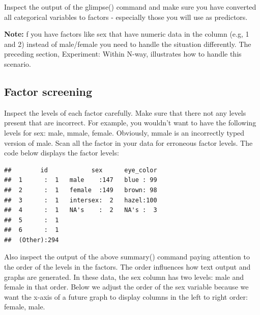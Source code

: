 \documentclass[
]{krantz}
\makeatletter
\newenvironment{Shaded}{\begin{snugshade}}{\end{snugshade}}
\newcommand{\KeywordTok}[1]{\textcolor[rgb]{0.27,0.27,0.27}{\textbf{#1}}}
\newcommand{\NormalTok}[1]{#1}
\newcommand{\OperatorTok}[1]{\textcolor[rgb]{0.43,0.43,0.43}{\textbf{#1}}}
\newcommand{\StringTok}[1]{\textcolor[rgb]{0.5,0.5,0.5}{#1}}
\newenvironment{kframe}{%
\medskip{}
\setlength{\fboxsep}{.8em}
 \def\at@end@of@kframe{}%
 \ifinner\ifhmode%
  \def\at@end@of@kframe{\end{minipage}}%
  \begin{minipage}{\columnwidth}%
 \fi\fi%
 \def\FrameCommand##1{\hskip\@totalleftmargin \hskip-\fboxsep
 \colorbox{shadecolor}{##1}\hskip-\fboxsep
     \hskip-\linewidth \hskip-\@totalleftmargin \hskip\columnwidth}%
 \MakeFramed {\advance\hsize-\width
   \@totalleftmargin\z@ \linewidth\hsize
   \@setminipage}}%
 {\par\unskip\endMakeFramed%
 \at@end@of@kframe}
\renewenvironment{Shaded}{\begin{kframe}}{\end{kframe}}
\makeatother
\begin{document}
Inspect the output of the glimpse() command and make sure you have converted all categorical variables to factors - especially those you will use as predictors.

\textbf{Note:} f you have factors like sex that have numeric data in the column (e.g, 1 and 2) instead of male/female you need to handle the situation differently. The preceding section, Experiment: Within N-way, illustrates how to handle this scenario.

\hypertarget{factor-screening-4}{%
\subsection{Factor screening}\label{factor-screening-4}}

Inspect the levels of each factor carefully. Make sure that there not any levels present that are incorrect. For example, you wouldn't want to have the following levels for sex: male, mmale, female. Obviously, mmale is an incorrectly typed version of male. Scan all the factor in your data for erroneous factor levels. The code below displays the factor levels:

\begin{Shaded}
\end{Shaded}

\begin{verbatim}
##        id            sex      eye_color  
##  1      :  1   male    :147   blue : 99  
##  2      :  1   female  :149   brown: 98  
##  3      :  1   intersex:  2   hazel:100  
##  4      :  1   NA's    :  2   NA's :  3  
##  5      :  1                             
##  6      :  1                             
##  (Other):294
\end{verbatim}

Also inspect the output of the above summary() command paying attention to the order of the levels in the factors. The order influences how text output and graphs are generated. In these data, the sex column has two levels: male and female in that order. Below we adjust the order of the sex variable because we want the x-axis of a future graph to display columns in the left to right order: female, male.
\end{document}
